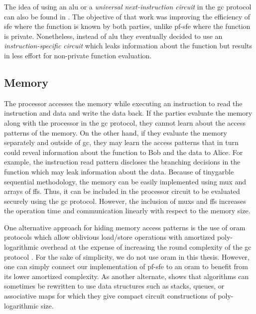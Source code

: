 The idea of using an \acrshort{alu} or a \emph{universal next-instruction circuit} in the \acrshort{gc} protocol can also be found in \cite{liu2014automating}.
The objective of that work was improving the efficiency of \acrshort{sfe} where the function is known by both parties, unlike \acrshort{pf-sfe} where the function is private.
Nonetheless, instead of \acrshort{alu} they eventually decided to use an \emph{instruction-specific circuit} which leaks information about the function but results in less effort for non-private function evaluation.

\subsection{Memory}\label{ssec:processor-mem}
The processor accesses the memory while executing an instruction to read the instruction and data and write the data back.
If the parties evaluate the memory along with the processor in the \acrshort{gc} protocol, they cannot learn about the access patterns of the memory.
On the other hand, if they evaluate the memory separately and outside of \acrshort{gc}, they may learn the access patterns that in turn could reveal information about the function to Bob and the data to Alice.
For example, the instruction read pattern discloses the branching decisions in the function which may leak information about the data.
Because of \gls{tinygarble} sequential methodology, the memory can be easily implemented using \acrshort{mux} and arrays of \acrshort{ff}s.
Thus, it can be included in the processor circuit to be evaluated securely using the \acrshort{gc} protocol.
However, the inclusion of \acrshort{mux}s and \acrshort{ff}s increases the operation time and communication linearly with respect to the memory size.

One alternative approach for hiding memory access patterns is the use of \acrfull{oram} protocols \cite{goldreich1996software} which allow oblivious load/store operations with amortized poly-logarithmic overhead at the expense of increasing the round complexity of the \acrshort{gc} protocol \cite{gordon2012secure,liu2014automating,lu2013garble,gentry2014garbled}.
For the sake of simplicity, we do not use \acrshort{oram} in this thesis.
However, one can simply connect our implementation of \acrshort{pf-sfe} to an \acrshort{oram} to benefit from its lower amortized complexity.
As another alternate, \cite{zahur2013circuit} shows that algorithms can sometimes be rewritten to use data structures such as stacks, queues, or associative maps for which they give compact circuit constructions of poly-logarithmic size.

